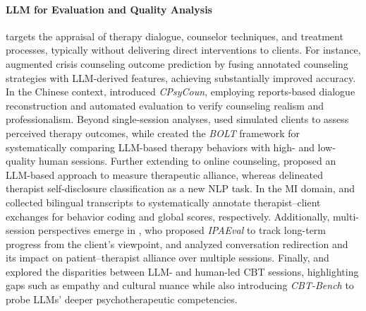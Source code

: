 \paragraph{LLM for Evaluation and Quality Analysis} targets the appraisal of therapy dialogue, counselor techniques, and treatment processes, typically without delivering direct interventions to clients. For instance, \citet{4} augmented crisis counseling outcome prediction by fusing annotated counseling strategies with LLM-derived features, achieving substantially improved accuracy. In the Chinese context, \citet{19} introduced \emph{CPsyCoun}, employing reports-based dialogue reconstruction and automated evaluation to verify counseling realism and professionalism. Beyond single-session analyses, \citet{32} used simulated clients to assess perceived therapy outcomes, while \citet{37} created the \emph{BOLT} framework for systematically comparing LLM-based therapy behaviors with high- and low-quality human sessions. Further extending to online counseling, \citet{39} proposed an LLM-based approach to measure therapeutic alliance, whereas \citet{62} delineated therapist self-disclosure classification as a new NLP task. In the MI domain, \citet{65} and \citet{67} collected bilingual transcripts to systematically annotate therapist–client exchanges for behavior coding and global scores, respectively. Additionally, multi-session perspectives emerge in \citet{101}, who proposed \emph{IPAEval} to track long-term progress from the client’s viewpoint, and \citet{103} analyzed conversation redirection and its impact on patient–therapist alliance over multiple sessions. Finally, \citet{111} and \citet{122} explored the disparities between LLM- and human-led CBT sessions, highlighting gaps such as empathy and cultural nuance while also introducing \emph{CBT-Bench} to probe LLMs’ deeper psychotherapeutic competencies.

